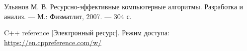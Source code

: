 
\renewcommand\bibname{\hfill{\centering СПИСОК ИСПОЛЬЗОВАННЫХ ИСТОЧНИКОВ}}

\begin{thebibliography}{}

	 Ульянов М. В. Ресурсно-эффективные компьютерные алгоритмы. Разработка и анализ. --- М.: Физматлит, 2007. --- 304 с.
	
	 C++ reference [Электронный ресурс]. Режим доступа: \url{https://en.cppreference.com/w/}
	
\end{thebibliography}
